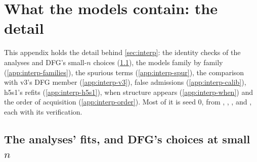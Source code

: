 \clearpage
\section{What the models contain: the detail}\label{app:interp-detail}

This appendix holds the detail behind \cref{sec:interp}: the identity checks of the analyses and DFG's small-$n$ choices (\cref{app:interp-fits}), the models family by family (\cref{app:interp-families}), the spurious terms (\cref{app:interp-spur}), the comparison with v3's DFG member (\cref{app:interp-v3}), false admissions (\cref{app:interp-calib}), h5s1's refits (\cref{app:interp-h5s1}), when structure appears (\cref{app:interp-when}) and the order of acquisition (\cref{app:interp-order}). Most of it is seed 0, from , , ,  and , each with its verification.

\subsection{The analyses' fits, and DFG's choices at small \texorpdfstring{$n$}{n}}\label{app:interp-fits}

